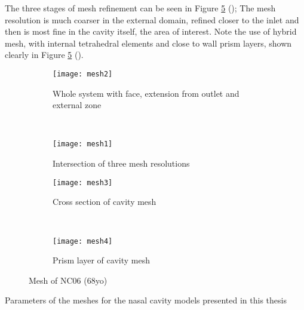 The three stages of mesh refinement can be seen in Figure \ref{fig:cavme} (); The mesh resolution is much coarser in the external domain, refined closer to the inlet and then is most fine in the cavity itself, the area of interest. Note the use of hybrid mesh, with internal tetrahedral elements and close to wall prism layers, shown clearly in Figure \ref{fig:cavme} ().

\begin{figure}
  \begin{subfigure}[t]{0.5\textwidth}
    \texttt{[image: mesh2]}
    \caption{Whole system with face, extension from outlet and external zone}
    \label{fig:mesh1}
  \end{subfigure}%
  ~%
  \begin{subfigure}[t]{0.5\textwidth}
    \texttt{[image: mesh1]}
    \caption{Intersection of three mesh resolutions}
    \label{fig:mesh2}
  \end{subfigure}

  \begin{subfigure}[t]{0.5\textwidth}
    \texttt{[image: mesh3]}
    \caption{Cross section of cavity mesh}
    \label{fig:mesh3}
  \end{subfigure}%
  ~%
  \begin{subfigure}[t]{0.5\textwidth}
    \texttt{[image: mesh4]}
    \caption{Prism layer of cavity mesh}
    \label{fig:mesh4}
  \end{subfigure}
  \caption{Mesh of NC06 (68yo)} \label{fig:cavme}
\end{figure}


  \begin{table} 
    \centering

  \caption{Parameters of the meshes for the nasal cavity models presented in this thesis}
  \label{tab:pvv}
\end{table}
